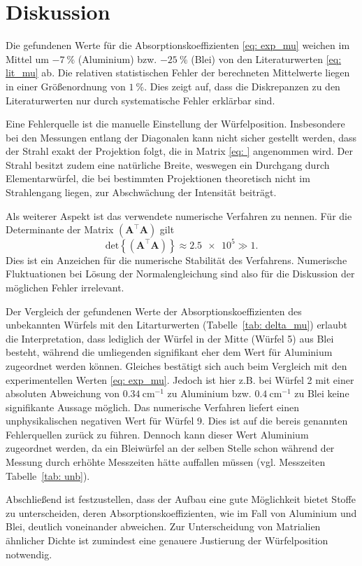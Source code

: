 \section{Diskussion}
Die gefundenen Werte für die Absorptionskoeffizienten \eqref{eq: exp_mu} weichen im Mittel
um $\SI{-7}{\percent}$ (Aluminium) bzw. $\SI{-25}{\percent}$ (Blei) von den Literaturwerten \eqref{eq: lit_mu} ab.
Die relativen statistischen Fehler der berechneten Mittelwerte liegen in einer Größenordnung von
$\SI{1}{\percent}$. Dies zeigt auf, dass die Diskrepanzen zu den Literaturwerten nur durch
systematische Fehler erklärbar sind.

Eine Fehlerquelle ist die manuelle Einstellung der Würfelposition. Insbesondere bei den Messungen
entlang der Diagonalen kann nicht sicher gestellt werden, dass der Strahl exakt der Projektion folgt,
die in Matrix \eqref{eq: } angenommen wird. Der Strahl besitzt zudem eine natürliche Breite, weswegen
ein Durchgang durch Elementarwürfel, die bei bestimmten Projektionen theoretisch nicht im Strahlengang liegen, zur
Abschwächung der Intensität beiträgt.

Als weiterer Aspekt ist das verwendete numerische Verfahren zu nennen. Für die Determinante der Matrix
$\left(\symbf{A}^\top \symbf{A}\right)$ gilt
\begin{equation}
  \mathup{det}\left\{\left(\symbf{A}^\top \symbf{A}\right)\right\} \approx \num{2.5e5} \gg 1.
\end{equation}
Dies ist ein Anzeichen für die numerische Stabilität des Verfahrens. Numerische Fluktuationen bei
Lösung der Normalengleichung sind also für die Diskussion der möglichen Fehler irrelevant.

Der Vergleich der gefundenen Werte der Absorptionskoeffizienten des unbekannten Würfels mit den
Litarturwerten (Tabelle~\ref{tab: delta_mu}) erlaubt die Interpretation, dass lediglich der
Würfel in der Mitte (Würfel 5) aus Blei besteht, während die umliegenden signifikant eher dem Wert
für Aluminium zugeordnet werden können. Gleiches bestätigt sich auch beim Vergleich mit den experimentellen
Werten \eqref{eq: exp_mu}. Jedoch ist hier z.B. bei Würfel 2 mit einer absoluten Abweichung von $\SI{0.34}{\centi\meter^{-1}}$ zu Aluminium
bzw. $\SI{0.4}{\centi\meter^{-1}}$ zu Blei keine signifikante Aussage möglich. Das numerische Verfahren liefert einen unphysikalischen
negativen Wert für Würfel 9. Dies ist auf die bereis genannten Fehlerquellen zurück zu führen.
Dennoch kann dieser Wert Aluminium zugeordnet werden, da ein Bleiwürfel an der selben Stelle schon während
der Messung durch erhöhte Messzeiten hätte auffallen müssen (vgl. Messzeiten Tabelle~\ref{tab: unb}).

Abschließend ist festzustellen, dass der Aufbau eine gute Möglichkeit bietet Stoffe zu unterscheiden, deren
Absorptionskoeffizienten, wie im Fall von Aluminium und Blei, deutlich voneinander abweichen. Zur Unterscheidung
von Matrialien ähnlicher Dichte ist zumindest eine genauere Justierung der Würfelposition notwendig.
